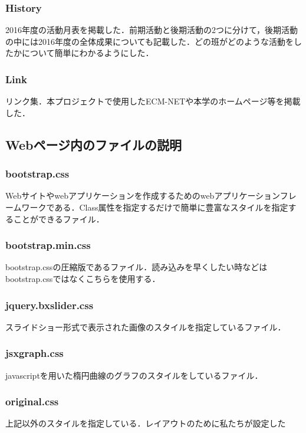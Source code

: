 \documentclass[openany,11pt,papersize]{jsbook}
\begin{document}

\subsubsection{History}
2016年度の活動月表を掲載した．前期活動と後期活動の2つに分けて，後期活動の中には2016年度の全体成果についても記載した．どの班がどのような活動をしたかについて簡単にわかるようにした．


\subsubsection{Link}
リンク集．本プロジェクトで使用したECM-NETや本学のホームページ等を掲載した．


\subsection{Webページ内のファイルの説明}

\subsubsection{bootstrap.css}
Webサイトやwebアプリケーションを作成するためのwebアプリケーションフレームワークである．Class属性を指定するだけで簡単に豊富なスタイルを指定することができるファイル．

\subsubsection{bootstrap.min.css}
bootstrap.cssの圧縮版であるファイル．読み込みを早くしたい時などはbootstrap.cssではなくこちらを使用する．

\subsubsection{jquery.bxslider.css}
スライドショー形式で表示された画像のスタイルを指定しているファイル．

\subsubsection{jsxgraph.css}
javascriptを用いた楕円曲線のグラフのスタイルをしているファイル．

\subsubsection{original.css}
上記以外のスタイルを指定している．レイアウトのために私たちが設定した
\end{document}
